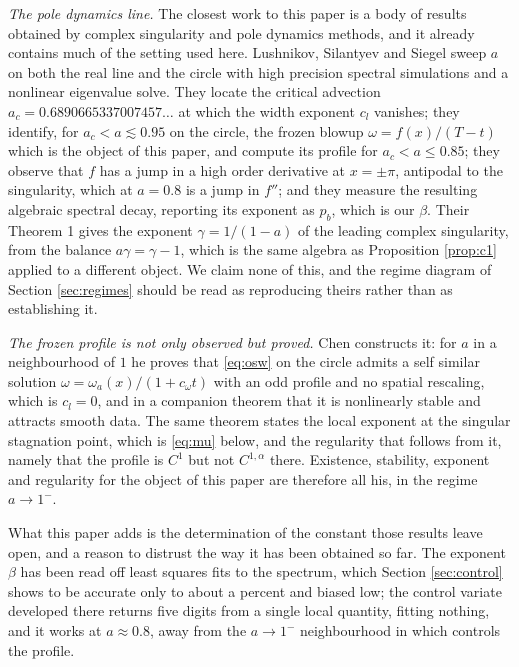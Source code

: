 \documentclass[11pt]{article}
\theoremstyle{definition}
\begin{document}
\emph{The pole dynamics line.} The closest work to this paper is a body of
results obtained by complex singularity and pole dynamics methods, and it
already contains much of the setting used here. Lushnikov, Silantyev and Siegel
\cite{lss2020} sweep $a$ on both the real line and the circle with high
precision spectral simulations and a nonlinear eigenvalue solve. They locate
the critical advection $a_c = 0.6890665337007457\ldots$ at which the width
exponent $c_l$ vanishes; they identify, for $a_c<a\lesssim 0.95$ on the circle,
the frozen blowup $\omega = f(x)/(T-t)$ which is the object of this paper, and
compute its profile for $a_c<a\le 0.85$; they observe that $f$ has a jump in a
high order derivative at $x=\pm\pi$, antipodal to the singularity, which at
$a=0.8$ is a jump in $f''$; and they measure the resulting algebraic spectral
decay, reporting its exponent as $p_b$, which is our $\beta$. Their Theorem 1
gives the exponent $\gamma = 1/(1-a)$ of the leading complex singularity, from
the balance $a\gamma = \gamma-1$, which is the same algebra as Proposition
\ref{prop:c1} applied to a different object. We claim none of this, and the
regime diagram of Section \ref{sec:regimes} should be read as reproducing
theirs rather than as establishing it.

\emph{The frozen profile is not only observed but proved.} Chen \cite{chenS1}
constructs it: for $a$ in a neighbourhood of $1$ he proves that \eqref{eq:osw}
on the circle admits a self similar solution $\omega = \omega_a(x)/(1+c_\omega
t)$ with an odd profile and no spatial rescaling, which is $c_l = 0$, and in a
companion theorem that it is nonlinearly stable and attracts smooth data. The
same theorem states the local exponent at the singular stagnation point, which
is \eqref{eq:mu} below, and the regularity that follows from it, namely that
the profile is $C^1$ but not $C^{1,\alpha}$ there. Existence, stability,
exponent and regularity for the object of this paper are therefore all his,
in the regime $a\to1^-$.

What this paper adds is the determination of the constant those results leave
open, and a reason to distrust the way it has been obtained so far. The
exponent $\beta$ has been read off least squares fits to the spectrum, which
Section \ref{sec:control} shows to be accurate only to about a percent and
biased low; the control variate developed there returns five digits from a
single local quantity, fitting nothing, and it works at $a\approx0.8$, away
from the $a\to1^-$ neighbourhood in which \cite{chenS1} controls the profile.
\end{document}
